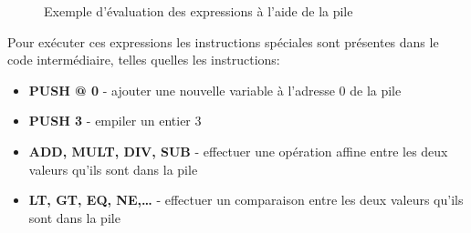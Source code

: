 \documentclass[12pt]{scrartcl}
\begin{document}
\begin{figure}[h]
  \centering
  \caption{Exemple d'évaluation des expressions à l'aide de la pile}
  \centering
  \label{fig:pile}
\end{figure}

Pour exécuter ces expressions les instructions spéciales sont présentes dans le code intermédiaire, 
telles quelles les instructions:
\begin{itemize} 
  \item \textbf{PUSH @ 0} - ajouter une nouvelle variable à l'adresse 0 de la pile
  \item \textbf{PUSH 3} - empiler un entier 3
  \item \textbf{ADD, MULT, DIV, SUB} - effectuer une opération affine entre les deux valeurs qu'ils sont dans la pile
  \item \textbf{LT, GT, EQ, NE,\dots} - effectuer un comparaison entre les deux valeurs qu'ils sont dans la pile
\end{itemize} 
\end{document}
